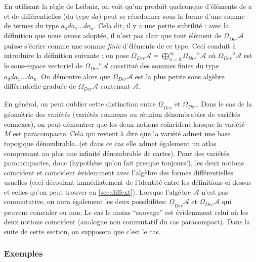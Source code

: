 En utilisant la r\`egle de Leibniz, on voit qu'un produit quelconque 
d'\'el\'ements de $a$ et de diff\'erentielles (du type $da$) peut se 
r\'eordonner sous la forme d'une somme de termes du type 
$a_{0}da_{1}\ldots da_{n}$. Cela dit, il y a une petite subtilit\'e : 
avec la d\'efinition que nous avons adopt\'ee, il n'est pas clair que 
tout \'el\'ement de $\underline{\Omega}_{Der}{\mathcal A}$ puisse s'\'ecrire comme une 
somme {\it finie \/} d'\'el\'ements de ce type. Ceci conduit \`a 
introduire la d\'efinition suivante : on pose $\Omega_{Der} {\mathcal A}= 
\bigoplus_{n=0}^{\infty} {\Omega_{Der}}^n {\mathcal A}$ o\`u 
${\Omega_{Der}}^n {\mathcal A}$ est le sous-espace vectoriel de 
$\underline{{\Omega_{Der}}}^n {\mathcal A}$ constitu\'e des sommes 
finies du type $a_{0}da_{1}\ldots da_{n}$. On d\'emontre alors 
\cite{MDV-cras} que $\Omega_{Der} {\mathcal A}$ est la plus petite 
sous alg\`ebre diff\'erentielle gradu\'ee de $\underline{{\Omega_{Der}}}{\mathcal 
A}$ contenant ${\mathcal A}$.


En g\'en\'eral, on peut oublier cette distinction entre  $\underline{\Omega}_{Der}$ et 
$\Omega_{Der}$. Dans le cas de la g\'eom\'etrie des vari\'et\'es (vari\'et\'es connexes ou r\'eunion d\'enombrables de 
vari\'et\'es connexes), on peut d\'emontrer
que les deux notions co\"incident lorsque la vari\'et\'e $M$ est 
paracompacte. Cela qui revient \`a dire que la vari\'et\'e admet une base 
topogique d\'enombrable\ldots (et dans ce cas elle admet \'egalement un atlas 
comprenant au plus une infinit\'e d\'enombrable de cartes). Pour des 
vari\'et\'es paracompactes, donc (hypoth\`ese qu'on fait presque toujours!),
les deux notions co\"incident et co\"incident \'evidemment avec l'alg\`ebre 
des formes diff\'erentielles usuelles (ceci d\'ecoulant imm\'ediatement de 
l'identit\'e entre les d\'efinitions ci-dessus et celles qu'on peut 
trouver en \ref{sec:diffext}). Lorsque l'alg\`ebre ${\mathcal A}$ n'est pas 
commutative, on aura  \'egalement les deux possibilites: 
$\underline{\Omega}_{Der}{\mathcal A}$ et  
$\Omega_{Der}{\mathcal A}$ qui peuvent co\"incider ou non. Le cas le moins 
``sauvage'' est \'evidemment celui o\`u les deux notions co\"incident 
(analogue non commutatif du cas paracompact). Dans la suite de cette 
section, on supposera que c'est le cas.

\subsubsection{Exemples}

